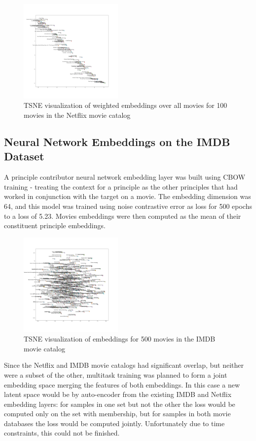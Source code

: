 \begin{figure}[h]
    \centering
    \includegraphics[width=0.45\textwidth]{images/tsne_weighted_all_nf_movie_emb.png}
    \caption{TSNE visualization of weighted embeddings over all movies for 100 movies in the Netflix movie catalog}
    \label{fig:TSNE Netflix Weighted Movie Embeddings}
\end{figure}
\subsection{Neural Network Embeddings on the IMDB Dataset}
A principle contributor neural network embedding layer was built using CBOW training - treating the context for a principle as the other principles that had worked in conjunction with the target on a movie. The embedding dimension was 64, and this model was trained using noise contrastive error as loss for 500 epochs to a loss of 5.23. Movies embeddings were then computed as the mean of their constituent principle embeddings. 
\begin{figure}[h]
    \centering
    \includegraphics[width=0.45\textwidth]{images/imdb_movie_embeddings_100.png}
    \caption{TSNE visualization of embeddings for 500 movies in the IMDB movie catalog}
    \label{fig:TSNE IMDB Movie Embeddings}
\end{figure}
Since the Netflix and IMDB movie catalogs had significant overlap, but neither were a subset of the other, multitask training was planned to form a joint embedding space merging the features of both embeddings. In this case a new latent space would be by auto-encoder from the existing IMDB and Netflix embedding layers: for samples in one set but not the other the loss would be computed only on the set with membership, but for samples in both movie databases the loss would be computed jointly. Unfortunately due to time constraints, this could not be finished.
